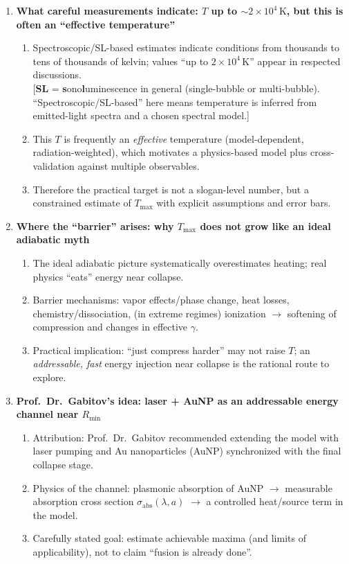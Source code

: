 \documentclass[11pt]{article}
\begin{document}
\begin{enumerate}
		\item \textbf{What careful measurements indicate: $T$ up to $\sim 2\times 10^{4}\,\mathrm{K}$, but this is often an ``effective temperature''}
		\begin{enumerate}
			\item Spectroscopic/SL-based estimates indicate conditions from thousands to tens of thousands of kelvin; values ``up to $2\times 10^{4}\,\mathrm{K}$'' appear in respected discussions.\\
			\hspace*{1.2em}[\textbf{SL} = \textbf{s}ono\textbf{l}uminescence in general (single-bubble or multi-bubble). ``Spectroscopic/SL-based'' here means temperature is inferred from emitted-light spectra and a chosen spectral model.]
			\item This $T$ is frequently an \emph{effective} temperature (model-dependent, radiation-weighted), which motivates a physics-based model plus cross-validation against multiple observables.
			\item Therefore the practical target is not a slogan-level number, but a constrained estimate of $T_{\max}$ with explicit assumptions and error bars.
		\end{enumerate}
		
		\item \textbf{Where the ``barrier'' arises: why $T_{\max}$ does not grow like an ideal adiabatic myth}
		\begin{enumerate}
			\item The ideal adiabatic picture systematically overestimates heating; real physics ``eats'' energy near collapse.
			\item Barrier mechanisms: vapor effects/phase change, heat losses, chemistry/dissociation, (in extreme regimes) ionization $\rightarrow$ softening of compression and changes in effective $\gamma$.
			\item Practical implication: ``just compress harder'' may not raise $T$; an \emph{addressable, fast} energy injection near collapse is the rational route to explore.
		\end{enumerate}
		
		\item \textbf{Prof.\ Dr.\ Gabitov's idea: laser + AuNP as an addressable energy channel near $R_{\min}$}
		\begin{enumerate}
			\item Attribution: Prof.\ Dr.\ Gabitov recommended extending the model with laser pumping and Au nanoparticles (AuNP) synchronized with the final collapse stage.
			\item Physics of the channel: plasmonic absorption of AuNP $\rightarrow$ measurable absorption cross section $\sigma_{\mathrm{abs}}(\lambda,a)$ $\rightarrow$ a controlled heat/source term in the model.
			\item Carefully stated goal: estimate achievable maxima (and limits of applicability), not to claim ``fusion is already done''.
		\end{enumerate}
		

\end{enumerate}
\end{document}
